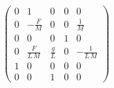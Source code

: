 \begin{equation}
\left(\begin{array}{ccccc} 0 & 1 & 0 & 0 & 0\\ 0 & -\frac{F}{M} & 0 & 0 & \frac{1}{M}\\ 0 & 0 & 0 & 1 & 0\\ 0 & \frac{F}{L\,M} & \frac{g}{L} & 0 & -\frac{1}{L\,M}\\ 1 & 0 & 0 & 0 & 0\\ 0 & 0 & 1 & 0 & 0 \end{array}\right)
\end{equation}
